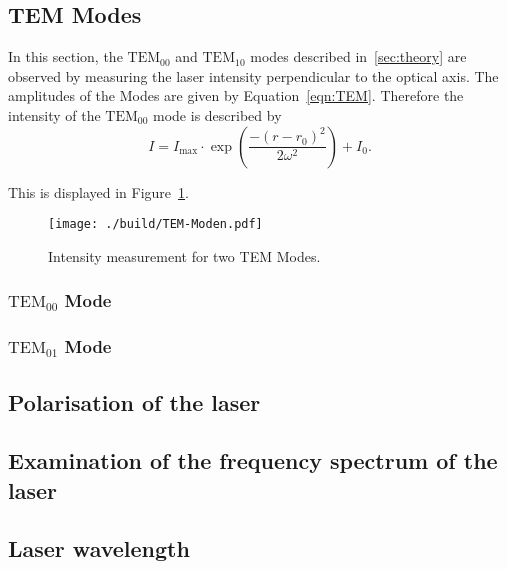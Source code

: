 \subsection{TEM Modes}
In this section, the $\text{TEM}_{00}$ and $\text{TEM}_{10}$ modes described in~\ref{sec:theory} are
observed by measuring the laser intensity perpendicular to the optical axis.
The amplitudes of the Modes are given by Equation~\ref{eqn:TEM}. Therefore the intensity of the $\text{TEM}_{00}$ mode
is described by
\begin{equation}
 I = I_{\text{max}} \cdot \exp{(\frac{-(r-r_{0})^{2}}{2 \omega^{2}})} + I_{0}.
 \label{eqn:TEM00-Fit}
\end{equation}
\noindent


This is displayed in Figure~\ref{fig:TEM-Messung}.
\begin{figure}
  \centering
  \texttt{[image: ./build/TEM-Moden.pdf]}
  \caption{Intensity measurement for two TEM Modes.}
  \label{fig:TEM-Messung}
\end{figure}
\noindent

\subsubsection{\texorpdfstring{$\text{TEM}_{00}$}{TEM} Mode}
\subsubsection{\texorpdfstring{$\text{TEM}_{01}$}{TEM} Mode}
\subsection{Polarisation of the laser}
\subsection{Examination of the frequency spectrum of the laser}
\subsection{Laser wavelength}
